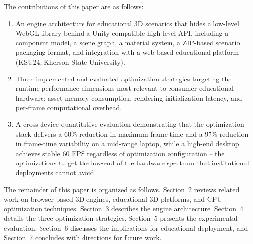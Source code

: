 The contributions of this paper are as follows:
\begin{enumerate}
    \item An engine architecture for educational 3D scenarios that hides a low-level WebGL library behind a Unity-compatible high-level API, including a component model, a scene graph, a material system, a ZIP-based scenario packaging format, and integration with a web-based educational platform (KSU24, Kherson State University).
    \item Three implemented and evaluated optimization strategies targeting the runtime performance dimensions most relevant to consumer educational hardware: asset memory consumption, rendering initialization latency, and per-frame computational overhead.
    \item A cross-device quantitative evaluation demonstrating that the optimization stack delivers a 60\% reduction in maximum frame time and a 97\% reduction in frame-time variability on a mid-range laptop, while a high-end desktop achieves stable 60 FPS regardless of optimization configuration -- the optimizations target the low-end of the hardware spectrum that institutional deployments cannot avoid.
\end{enumerate}

The remainder of this paper is organized as follows. Section~2 reviews related work on browser-based 3D engines, educational 3D platforms, and GPU optimization techniques. Section~3 describes the engine architecture. Section~4 details the three optimization strategies. Section~5 presents the experimental evaluation. Section~6 discusses the implications for educational deployment, and Section~7 concludes with directions for future work.